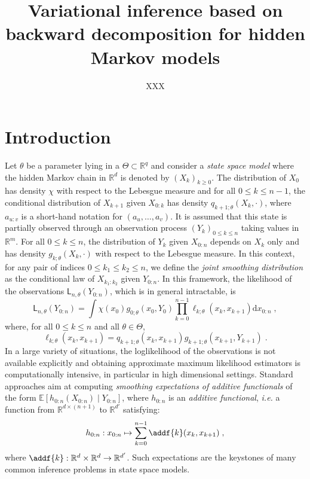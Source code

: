 \documentclass{article}
\title{Variational inference based on backward decomposition for hidden Markov models}
\date{}
\author[$\dag$]{XXX}
\affil[$\dag$]{{\small }}
\newcommand{\1}{\mathbbm{1}}
\newcommand{\md}[1]{g_{#1}}
\newcommand{\llh}[1]{\mathsf{L}_{#1}}
\newcommand{\parvec}{\theta}
\newcommand{\parspace}{\Theta}
\newcommand{\af}[1]{h_{#1}}
\newcommand{\hd}[1]{q_{#1}}
\def\pE{\mathbb{E}}
\newcommand{\rset}{\ensuremath{\mathbb{R}}}
\newcommand{\rmd}{\ensuremath{\mathrm{d}}}
\newcommand{\eqsp}{\;}
\newcommand{\qg}[1]{\ell_{#1}}
\begin{document}
\maketitle

\begin{abstract}

\end{abstract}

\section{Introduction}
Let $\parvec$ be a parameter lying in a $\Theta\subset \rset^q$ and consider a  \textit{state space model} where the hidden Markov chain  in $\rset^d$ is denoted by $(X_k)_{k\geqslant 0}$. The distribution of $X_0$ has density $\chi$ with respect to the Lebesgue measure and for all $0\leqslant k \leqslant n-1$, the conditional distribution of $X_{k+1} $ given $X_{0:k}$ has density $\hd{k+1;\parvec}(X_{k},\cdot)$, where $a_{u:v}$ is a short-hand notation for $(a_u,\ldots,a_v)$. 
It is assumed that this state  is partially observed  through an observation process $(Y_k)_{0\leqslant k \leqslant n}$ taking values in $\rset^m$. 
For all $0\leqslant k \leqslant n$, the distribution of $Y_k$ given $X_{0:n}$ depends on $X_k$ only and has density $\md{k;\parvec}(X_k,\cdot)$ with respect to the Lebesgue measure. 
In this context, for any pair of indices $0\leqslant k_1 \leqslant k_2 \leqslant n$, we define the \textit{joint smoothing distribution} as the conditional law of $X_{k_1:k_2}$ given $Y_{0:n}$. 
In this framework, the likelihood of the observations $\llh{n,\parvec}(Y_{0:n})$, which is  in general intractable, is
$$
\llh{n,\parvec}(Y_{0:n})  = \int \chi(x_0)\md{0;\parvec}(x_{0},Y_{0})\prod_{k=0}^{n-1}\qg{k;\parvec}(x_{k},x_{k+1})\rmd x_{0:n}\eqsp,
$$
 where, for all $0\leqslant k \leqslant n$ and all $\parvec\in\parspace$,
\begin{equation}
\label{eq:def:elln}
\qg{k;\parvec}(x_{k},x_{k+1}) = \hd{k+1;\parvec}(x_{k}, x_{k+1})\md{k+1;\parvec}(x_{k+1},Y_{k+1})\eqsp.
\end{equation}
In a large variety of situations, the loglikelihood of the observations is not available explicitly and obtaining approximate maximum likelihood estimators is computationally intensive, in particular in high dimensional settings. Standard approaches  aim at computing \textit{smoothing expectations of additive functionals} of the form $\pE \left[\af{0:n}(X_{0:n})\middle | Y_{0:n}\right]$,  where $\af{0:n}$ is an \textit{additive functional}, \textit{i.e.} a function from $\rset^{d \times (n + 1)}$ to $\rset^{d'}$ satisfying:
\begin{equation}
\label{eq:additive:functional}
\af{0:n}: x_{0:n} \mapsto \sum_{k=0}^{n-1}\addf{k}(x_{k},x_{k+1})\eqsp,
\end{equation}
where $\addf{k}:\rset^{d} \times \rset^{d}\to\rset^{d'}$.
Such expectations are the keystones of many common inference problems in state space models.
\end{document}

